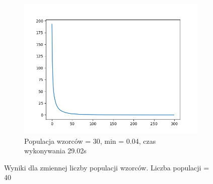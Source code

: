 \documentclass[12pt]{article}
\begin{document}
\begin{figure}[H]
\begin{subfigure}{0.32\textwidth}
        \includegraphics[width=\linewidth]{plots/s8.png}
        \caption{Populacja wzorców = 30, min = 0.04, czas wykonywania 29.02s}
    \end{subfigure}
    \caption{Wyniki dla zmiennej liczby populacji wzorców. Liczba populacji = 40}
\end{figure}
\end{document}
